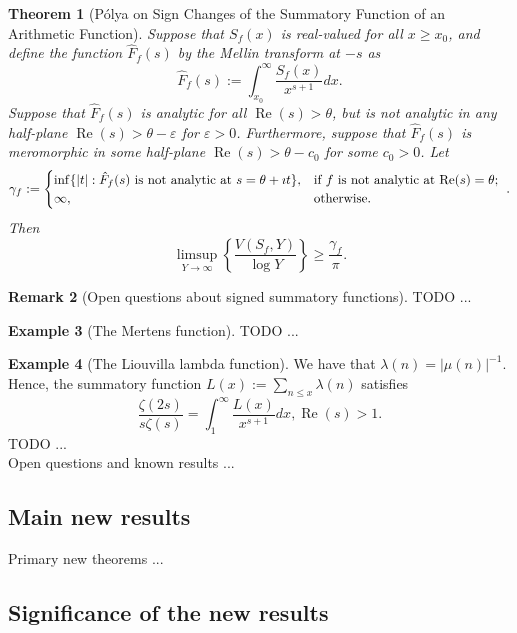 \documentclass[11pt,reqno,a4letter]{article}
\numberwithin{figure}{section}
\numberwithin{table}{section}
\theoremstyle{plain}
\newtheorem{theorem}{Theorem}
\numberwithin{theorem}{section}
\theoremstyle{definition}
\newtheorem{example}[theorem]{Example}
\newtheorem{remark}[theorem]{Remark}
\renewcommand{\Re}{\operatorname{Re}}
\begin{document}
\begin{theorem}[P\'olya on Sign Changes of the Summatory Function of an Arithmetic Function] 
Suppose that $S_f(x)$ is real-valued for all $x \geq x_0$, and define the function 
$\hat{F}_f(s)$ by the Mellin transform at $-s$ as 
\[
\hat{F}_f(s) := \int_{x_0}^{\infty} \frac{S_f(x)}{x^{s+1}} dx. 
\]
Suppose that $\hat{F}_f(s)$ is analytic for all $\Re(s) > \theta$, but is not analytic 
in any half-plane $\Re(s) > \theta - \varepsilon$ for $\varepsilon > 0$. 
Furthermore, suppose that $\hat{F}_f(s)$ is meromorphic in some half-plane 
$\Re(s) > \theta - c_0$ for some $c_0 > 0$. Let 
\[
\gamma_f := \begin{cases} 
     \inf \{|t|: \hat{F}_f(s) \text{\ is not analytic at\ } s = \theta+\imath t\}, & \text{\rm
     if $f$ is not analytic at $\Re(s) = \theta$; } \\ 
     \infty, & \text{\rm otherwise.}
     \end{cases}. 
 \]
 Then 
 \[
 \limsup_{Y \rightarrow \infty} \left\{\frac{V(S_f, Y)}{\log Y}\right\} \geq \frac{\gamma_f}{\pi}. 
\]
\end{theorem} 

\begin{remark}[Open questions about signed summatory functions]
TODO ... 
\end{remark}

\begin{example}[The Mertens function]
TODO ... 
\end{example}

\begin{example}[The Liouvilla lambda function]
We have that $\lambda(n) = |\mu(n)|^{-1}$. Hence, the summatory function 
     $L(x) := \sum_{n \leq x} \lambda(n)$ satisfies 
\[
\frac{\zeta(2s)}{s \zeta(s)} = \int_1^{\infty} \frac{L(x)}{x^{s+1}} dx, \Re(s) > 1. 
\]
TODO ... \\ Open questions and known results ... \\ 
\end{example}

\subsection{Main new results} 

Primary new theorems ... \\ 


\subsection{Significance of the new results} 
\end{document}
